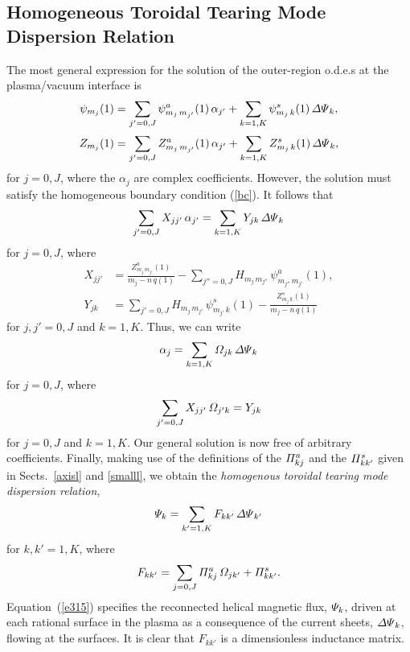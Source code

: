 \documentclass[12pt,prb,aps]{revtex4-1}
\begin{document}
\subsection{Homogeneous Toroidal Tearing Mode Dispersion Relation}\label{disp}
The most general expression for the solution of the outer-region o.d.e.s at the plasma/vacuum interface is
\begin{align}\label{e385}
\psi_{m_j}(1) &= \sum_{j'=0,J}\psi_{m_j\,m_{j'}}^a(1)\,\alpha_{j'} + \sum_{k=1,K}\psi_{m_j\,k}^s(1)\,{\mit\Delta\Psi}_k,\\[0.5ex]
Z_{m_j}(1) &= \sum_{j'=0,J}Z_{m_j\,m_{j'}}^a(1)\,\alpha_{j'} + \sum_{k=1,K}Z_{m_j\,k}^s(1)\,{\mit\Delta\Psi}_k,\label{e386}
\end{align}
for $j=0,J$, where the $\alpha_j$ are complex coefficients. However,  the solution must satisfy the homogeneous boundary condition (\ref{bc}). 
It follows that
\begin{equation}
\sum_{j'=0,J}X_{jj'}\,\alpha_{j'} = \sum_{k=1,K}Y_{jk}\,{\mit\Delta\Psi}_k
\end{equation}
for $j=0,J$, where
\begin{align}
X_{jj'} &=\frac{Z_{m_j\,m_{j'}}^{a}(1)}{m_j-n\,q(1)}-\sum_{j''=0,J}H_{m_j\,m_{j''}}\,\psi_{m_{j''}\,m_{j'}}^a(1),\\[0.5ex]
Y_{jk} &= \sum_{j'=0,J}H_{m_j\,m_{j'}}\,\psi_{m_{j'}\,k}^{s}(1)-
\frac{Z_{m_j\,k}^s(1)}{m_j-n\,q(1)}
\end{align}
for $j,j'=0,J$ and $k=1,K$. Thus, we can write
\begin{equation}
\alpha_j = \sum_{k=1,K}{\mit\Omega}_{jk}\,{\mit\Delta\Psi}_k
\end{equation}
for $j=0,J$, 
where
\begin{equation}
\sum_{j'=0,J}X_{jj'}\,{\mit\Omega}_{j'k} = Y_{jk}
\end{equation}
for $j=0,J$ and $k=1,K$. Our general solution is now free of arbitrary coefficients.
 Finally, making use of the definitions of the ${\mit\Pi}_{kj}^a$ and the ${\mit\Pi}_{kk'}^s$ given in Sects.~\ref{axisl} and \ref{smalll}, we obtain the {\em homogenous toroidal tearing mode dispersion relation},\cite{connor,cht,am1,pletz}
\begin{equation}\label{e315}
{\mit\Psi}_k = \sum_{k'=1,K}F_{kk'}\,{\mit\Delta\Psi}_{k'}
\end{equation}
for $k,k'=1,K$, where
\begin{equation}
F_{kk'}=\sum_{j=0,J}{\mit\Pi}^a_{kj}\,{\mit\Omega}_{jk'} + {\mit\Pi}^s_{kk'}.
\end{equation}
Equation~(\ref{e315}) specifies the reconnected helical magnetic flux, ${\mit\Psi}_k$, driven at each rational surface in the plasma
as a consequence of the current sheets, ${\mit\Delta\Psi}_k$, flowing at the surfaces. It is clear that $F_{kk'}$ is a dimensionless
inductance matrix.\cite{rfbook}
\end{document}

